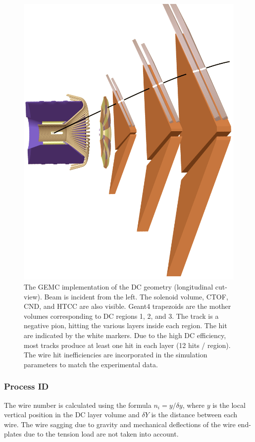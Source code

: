 \begin{figure}[h]
	\centering
	\includegraphics[width=0.99\columnwidth,keepaspectratio]{img/dcGeometry.png}
	\caption{The GEMC implementation of the DC geometry (longitudinal cut-view).
	         Beam is incident from the left. The solenoid volume, CTOF, CND, and HTCC are also visible.
             Geant4 trapezoids are the mother volumes corresponding to DC regions 1, 2, and 3. The track is a negative pion,
			 hitting the various layers inside each region. The hit are indicated by the white markers. Due to the high DC
             efficiency, most tracks produce at least one hit in each layer (12 hits / region).
             The wire hit inefficiencies are incorporated in the simulation parameters to match the experimental data.}
	\label{fig:dcGeometry}
\end{figure}


\subsubsection{Process ID}
The wire number is calculated using the formula $n_i = y / \delta y$, where $y$ is the local vertical position in the DC layer volume
and $\delta Y$ is the distance between each wire.
The wire sagging due to gravity and mechanical deflections of the wire end-plates due to the tension load are not taken into account.

